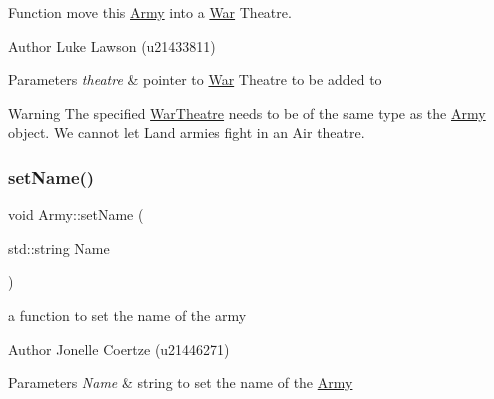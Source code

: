 Function move this \mbox{\hyperlink{class_army}{Army}} into a \mbox{\hyperlink{class_war}{War}} Theatre. 

\begin{DoxyAuthor}{Author}
Luke Lawson (u21433811) 
\end{DoxyAuthor}

\begin{DoxyParams}{Parameters}
{\em theatre} & pointer to \mbox{\hyperlink{class_war}{War}} Theatre to be added to \\
\hline
\end{DoxyParams}
\begin{DoxyWarning}{Warning}
The specified \mbox{\hyperlink{class_war_theatre}{War\+Theatre}} needs to be of the same type as the \mbox{\hyperlink{class_army}{Army}} object. We cannot let Land armies fight in an Air theatre. 
\end{DoxyWarning}
\mbox{\label{class_army_a54af3a0b0beab32446d47bb409a39685}} 
\subsubsection{\texorpdfstring{setName()}{setName()}}
{\footnotesize\ttfamily void Army\+::set\+Name (\begin{DoxyParamCaption}\item[{std\+::string}]{Name }\end{DoxyParamCaption})}



a function to set the name of the army 

\begin{DoxyAuthor}{Author}
Jonelle Coertze (u21446271) 
\end{DoxyAuthor}

\begin{DoxyParams}{Parameters}
{\em Name} & string to set the name of the \mbox{\hyperlink{class_army}{Army}} \\
\hline
\end{DoxyParams}
